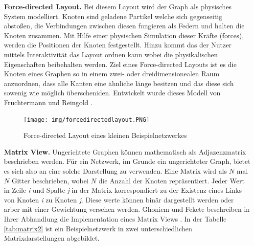 \documentclass[draft=false
              ,paper=a4
              ,twoside=false
              ,fontsize=11pt
              ,headsepline
              ,BCOR10mm
              ,DIV11
              ]{scrbook}
\newcommand{\TODO}[1]{\colorbox{yellow}{\textcolor{red}{[TODO: #1]}}}
\begin{document}
\textbf{Force-directed Layout.}  Bei diesem Layout wird der Graph als physisches System modelliert. Knoten sind geladene Partikel welche sich gegenseitig abstoßen, die Verbindungen zwischen diesen fungieren als Federn und halten die Knoten zusammen. Mit Hilfe einer physischen Simulation dieser Kräfte (forces), werden die Positionen der Knoten festgestellt. Hinzu kommt das der Nutzer mittels Interaktivität das Layout ordnen kann wobei die physikalischen Eigenschaften beibehalten werden. Ziel eines Force-directed Layouts ist es die Knoten eines Graphen so in einem zwei- oder dreidimensionealen Raum anzuordnen, dass alle Kanten eine ähnliche länge besitzen und das diese sich sowenig wie möglich überscheniden. Entwickelt wurde dieses Modell von Fruchtermann und Reingold \cite{Fruchterman91graphdrawing}. %

\begin{figure}[htbp]
  \centering
  \texttt{[image: img/forcedirectedlayout.PNG]}
  \caption{Force-directed Layout eines kleinen Beispielnetzwerkes}
  \label{fig:forcedirected}
\end{figure}

\textbf{Matrix View.} Ungerichtete Graphen können mathematisch als Adjazenzmatrix beschrieben werden. Für ein Netzwerk, im Grunde ein ungerichteter Graph, bietet es sich also an eine solche Darstellung zu verwenden. Eine Matrix wird als $N$ mal $N$ Gitter beschrieben, wobei $N$ die Anzahl der Knoten repräsentiert. Jeder Wert in Zeile \textit{i} und Spalte \textit{j} in der Matrix korrespondiert zu der Existenz eines Links von Knoten \textit{i} zu Knoten \textit{j}. Diese werte können binär dargestellt werden oder arber mit einer Gewichtung versehen werden. Ghoniem und Fekete beschreiben in Ihrer Abhandlung die Implementation eines Matrix Views \cite{Ghoniem:2003:MVG:1063669.1063698}. In der Tabelle \ref{tab:matrix2} ist ein Beispielnetzwerk in zwei unterschiedlichen Matrixdarstellungen abgebildet.
\end{document}
